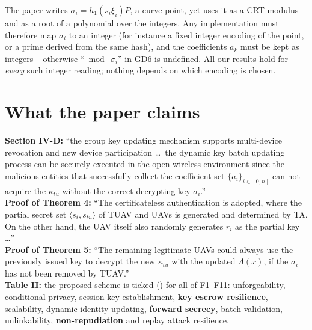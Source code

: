 \begin{remark}\label{rem:typing}
The paper writes $\sigma_i=h_1(s_i\xi_i)P$, a curve point, yet uses it as a CRT modulus and as a root of a polynomial over the integers. Any
implementation must therefore map $\sigma_i$ to an integer (for instance a fixed integer encoding of the point, or a prime derived from the same hash),
and the coefficients $a_k$ must be kept as integers -- otherwise ``$\bmod\ \sigma_i$'' in GD6 is undefined. All our results hold for \emph{every} such
integer reading; nothing depends on which encoding is chosen.
\end{remark}

\section{What the paper claims}
\begin{claimbox}
\textbf{Section IV-D:} ``the group key updating mechanism supports multi-device revocation and new device participation \dots\ the dynamic key batch
updating process can be securely executed in the open wireless environment since the malicious entities that successfully collect the coefficient set
$\{a_i\}_{i\in[0,n]}$ can not acquire the $\kappa_{tu}$ without the correct decrypting key $\sigma_i$.''\\[3pt]
\textbf{Proof of Theorem 4:} ``The certificateless authentication is adopted, where the partial secret set $\langle s_i,s_{tu}\rangle$ of TUAV and UAVs is
generated and determined by TA. On the other hand, the UAV itself also randomly generates $r_i$ as the partial key \dots''\\[3pt]
\textbf{Proof of Theorem 5:} ``The remaining legitimate UAVs could always use the previously issued key to decrypt the new $\kappa_{tu}$ with the updated
$\Lambda(x)$, if the $\sigma_i$ has not been removed by TUAV.''\\[3pt]
\textbf{Table II:} the proposed scheme is ticked (\yes) for all of F1--F11: unforgeability, conditional privacy, session key establishment,
\textbf{key escrow resilience}, scalability, dynamic identity updating, \textbf{forward secrecy}, batch validation, unlinkability,
\textbf{non-repudiation} and replay attack resilience.
\end{claimbox}

